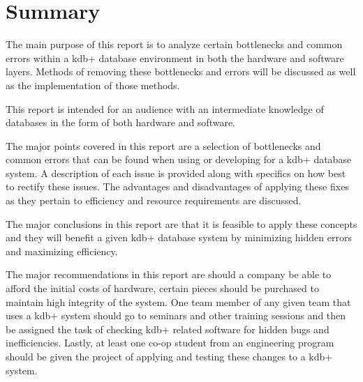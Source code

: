 \section*{Summary} %
\label{sec:summary}

The main purpose of this report is to analyze certain bottlenecks and common errors within a kdb+ database environment in both the hardware and software layers.  Methods of removing these bottlenecks and errors will be discussed as well as the implementation of those methods.\newline
 
This report is intended for an audience with an intermediate knowledge of databases in the form of both hardware and software.\newline

The major points covered in this report are a selection of bottlenecks and common errors that can be found when using or developing for a kdb+ database system.  A description of each issue is provided along with specifics on how best to rectify these issues.  The advantages and disadvantages of applying these fixes as they pertain to efficiency and resource requirements are discussed.\newline

The major conclusions in this report are that it is feasible to apply these concepts and they will benefit a given kdb+ database system by minimizing hidden errors and maximizing efficiency.\newline

The major recommendations in this report are should a company be able to afford the initial costs of hardware, certain pieces should be purchased to maintain high integrity of the system.  One team member of any given team that uses a kdb+ system should go to seminars and other training sessions and then be assigned the task of checking kdb+ related software for hidden bugs and inefficiencies.  Lastly, at least one co-op student from an engineering program should be given the project of applying and testing these changes to a kdb+ system.
